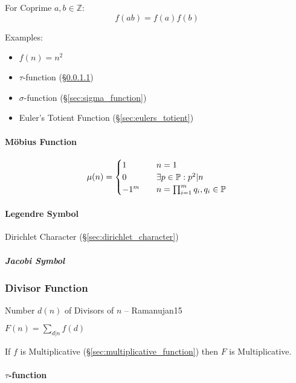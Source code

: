 For Coprime $a,b \in \mathbb{Z}$:
\[
  f(ab) = f(a)f(b)
\]

Examples:
\begin{itemize}
  \item $f(n) = n^2$
  \item $\tau$-function (\S\ref{sec:tau_function})
  \item $\sigma$-function (\S\ref{sec:sigma_function})
  \item Euler's Totient Function (\S\ref{sec:eulers_totient})
\end{itemize}



\paragraph{M\"obius Function}\label{sec:mobius_function}\hfill

\[
  \mu(n) =
  \begin{cases}
  1     & \quad n = 1 \\
  0     & \quad \exists p \in \mathbb{P} : p^2|n \\
  -1^m  & \quad n = \prod_{i = 1}^m q_i, q_i \in \mathbb{P} \\
  \end{cases}
\]



\paragraph{Legendre Symbol}\label{sec:legendre_symbol}\hfill

Dirichlet Character (\S\ref{sec:dirichlet_character})



\subparagraph{Jacobi Symbol}\label{sec:jacobi_symbol}\hfill



\subsubsection{Divisor Function}\label{sec:divisor_function}

Number $d(n)$ of Divisors of $n$ -- Ramanujan15

$F(n) = \sum_{d|n}f(d)$

If $f$ is Multiplicative (\S\ref{sec:multiplicative_function}) then
$F$ is Multiplicative.



\paragraph{$\tau$-function}\label{sec:tau_function}\hfill

